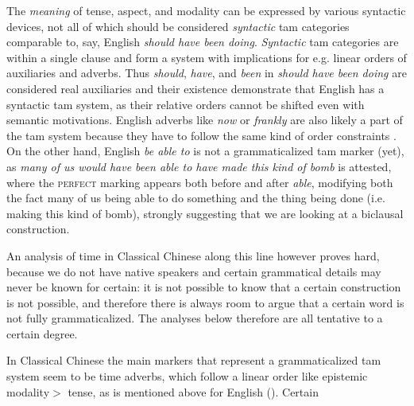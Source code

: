 \documentclass[UTF8, a4paper, oneside, scheme=plain, 12pt]{ctexrep}
\newcommand*{\textgt}{$>$ }
\newcommand{\form}[1]{\emph{#1}}
\newcommand*{\category}[1]{\textsc{#1}}
\begin{document}
The \emph{meaning} of tense, aspect, and modality can be expressed by various syntactic devices,
not all of which should be considered \emph{syntactic} \ac{tam} categories comparable to, say, English \form{should have been doing}.
\emph{Syntactic} \ac{tam} categories are within a single clause
and form a system with implications for e.g. linear orders of auxiliaries and adverbs.
Thus \form{should}, \form{have}, and \form{been} in \form{should have been doing}
are considered real auxiliaries and their existence demonstrate that English has a syntactic \ac{tam} system,
as their relative orders cannot be shifted even with semantic motivations.
English adverbs like \form{now} or \form{frankly} are also likely a part of the \ac{tam} system
because they have to follow the same kind of order constraints \citep{cinque1999adverbs}.
On the other hand, English \form{be able to} is not a grammaticalized \ac{tam} marker (yet),
as \form{many of us would have been able to have made this kind of bomb} is attested,
where the \category{perfect} marking appears both before and after \form{able},
modifying both the fact many of us being able to do something
and the thing being done (i.e. making this kind of bomb),
strongly suggesting that we are looking at a biclausal construction.

An analysis of time in Classical Chinese along this line however proves hard,
because we do not have native speakers and certain grammatical details may never be known for certain:
it is not possible to know that a certain construction is not possible,
and therefore there is always room to argue that a certain word is not fully grammaticalized.
The analyses below therefore are all tentative to a certain degree.

In Classical Chinese the main markers that represent a grammaticalized \ac{tam} system seem to be time adverbs, which follow a linear order like epistemic modality\textgt tense, as is mentioned above for English ().
Certain 
\end{document}
